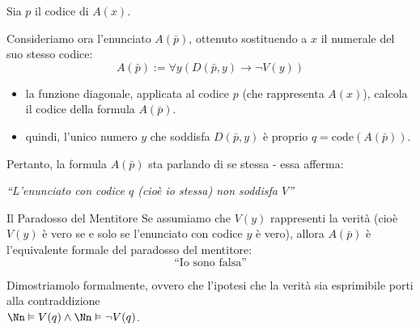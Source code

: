 \documentclass[a4paper,11pt]{report}
\begin{document}
Sia \( p \) il codice di \( A(x) \).

Consideriamo ora l'enunciato \( A(\bar{p}) \), ottenuto sostituendo a \( x \) il numerale del suo stesso codice:
    \[ A(\bar{p}) := \forall y (D(\bar{p}, y)\to \neg V(y)) \]
    \begin{itemize}
        \item la funzione diagonale, applicata al codice \( p \) (che rappresenta \( A(x) \)), calcola il codice della formula \( A(\bar{p}) \).
        \item quindi, l'unico numero \( y \) che soddisfa \( D(\bar{p}, y) \) è proprio \( q = \text{code}(A(\bar{p})) \).
    \end{itemize}

    Pertanto, la formula \( A(\bar{p}) \) sta parlando di se stessa - essa afferma:
    \begin{center}
        \textit{``L'enunciato con codice \( q \) (cioè io stessa) non soddisfa \( V \)''}
    \end{center}

    \begin{gframe}{Il Paradosso del Mentitore}
        Se assumiamo che \( V(y) \) rappresenti la verità (cioè \( V(y) \) è vero se e solo se l'enunciato con codice \( y \) è vero), allora \( A(\bar{p}) \) è l'equivalente formale del paradosso del mentitore:
        \[ \text{``Io sono falsa''} \]
    \end{gframe}

Dimostriamolo formalmente, ovvero che l'ipotesi che la verità sia esprimibile porti alla contraddizione\\ \( \Nn \vDash V(q) \land \Nn \vDash \neg V(q) \).
\end{document}

